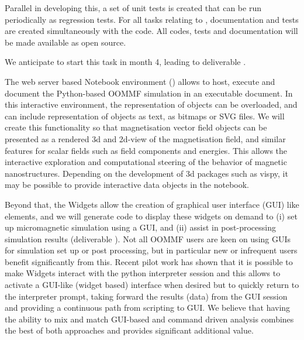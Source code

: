 \begin{workpackage}
\begin{tasklist}
\begin{task}[id=oommf-python-interface,title=OOMMF case study: Create Python interface to OOMMF code]
  Parallel in developing this, a set of unit tests is created that can
  be run periodically as regression tests. For all tasks relating to
  \OOMMFNB, documentation and tests are created simultaneously with
  the code. All codes, tests and documentation will be made available as open source.

  We anticipate to start this task 
  in month 4, leading to deliverable .
\end{task}

\begin{task}[title=OOMMF case study: Extend \texttt{OOMMF-py} with \Jupyter
    notebook attributes and GUI templates,id=oommf-py-ipython-attributes]

  The web server based Notebook environment (\Jupyter) allows to host,
  execute and document the Python-based OOMMF simulation in an
  executable document. In this interactive environment, the
  representation of objects can be overloaded, and can include
  representation of objects as text, as bitmaps or SVG files. We will
  create this functionality so that magnetisation vector field objects
  can be presented as a rendered 3d and 2d-view of the magnetisation
  field, and similar features for scalar fields such as field
  components and energies. This allows the interactive exploration and
  computational steering of the behavior of magnetic
  nanostructures. Depending on the development of 3d packages such as
  vispy, it may be possible to provide interactive data objects in the
  notebook.

  Beyond that, the \Jupyter Widgets allow the creation of graphical
  user interface (GUI) like elements, and we will generate code to
  display these widgets on demand to (i) set up micromagnetic
  simulation using a GUI, and (ii) assist in post-processing
  simulation results (deliverable ). 
  Not all OOMMF users are keen on using GUIs for
  simulation set up or post processing, but in particular new or
  infrequent users benefit significantly from this. Recent pilot work
  has shown that it is possible to make \Jupyter Widgets interact with
  the python interpreter session and this allows to activate a
  GUI-like (widget based) interface when desired but to quickly return
  to the interpreter prompt, taking forward the results (data) from
  the GUI session \cite{IPython-widget-GUI-demo-youtube-2014} and
  providing a continuous path from scripting to GUI. We
  believe that having the ability to mix and match GUI-based and
  command driven analysis combines the best of both approaches and
  provides significant additional value. 
\end{task}


\end{tasklist}
\end{workpackage}
